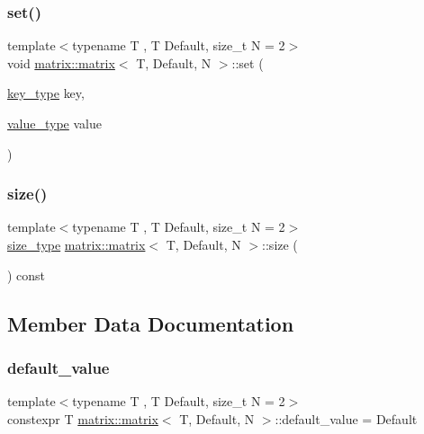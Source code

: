 \subsubsection{\texorpdfstring{set()}{set()}}
{\footnotesize\ttfamily template$<$typename T , T Default, size\+\_\+t N = 2$>$ \\
void \hyperlink{structmatrix_1_1matrix}{matrix\+::matrix}$<$ T, Default, N $>$\+::set (\begin{DoxyParamCaption}\item[{\hyperlink{structmatrix_1_1matrix_af7b5498ac1b615cb9ef51bd185a2557e}{key\+\_\+type}}]{key,  }\item[{\hyperlink{structmatrix_1_1matrix_ab940e7a84942339cdee7c0f0d3bd8ef9}{value\+\_\+type}}]{value }\end{DoxyParamCaption})\hspace{0.3cm}{\ttfamily [inline]}}

\mbox{\label{structmatrix_1_1matrix_a56f1554d0f871ac5e2b3dac89d26113e}} 
\subsubsection{\texorpdfstring{size()}{size()}}
{\footnotesize\ttfamily template$<$typename T , T Default, size\+\_\+t N = 2$>$ \\
\hyperlink{structmatrix_1_1matrix_aebc6efd587a1c3f0a951631d6ee6837f}{size\+\_\+type} \hyperlink{structmatrix_1_1matrix}{matrix\+::matrix}$<$ T, Default, N $>$\+::size (\begin{DoxyParamCaption}{ }\end{DoxyParamCaption}) const\hspace{0.3cm}{\ttfamily [inline]}}



\subsection{Member Data Documentation}
\mbox{\label{structmatrix_1_1matrix_a4c0193b1fdd949b71f717232cd2c7ce1}} 
\subsubsection{\texorpdfstring{default\+\_\+value}{default\_value}}
{\footnotesize\ttfamily template$<$typename T , T Default, size\+\_\+t N = 2$>$ \\
constexpr T \hyperlink{structmatrix_1_1matrix}{matrix\+::matrix}$<$ T, Default, N $>$\+::default\+\_\+value = Default\hspace{0.3cm}{\ttfamily [static]}}

